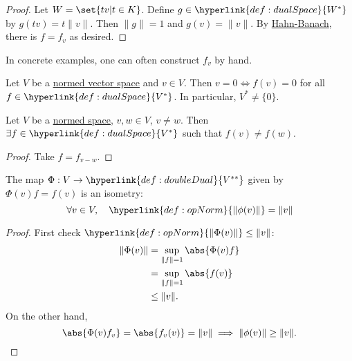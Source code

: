\documentclass{article}
\begin{document}
\begin{proof}
    Let $W = \set{t v | t \in K}$.
    Define $g \in \hyperlink{def:dualSpace}{W^*}$ by $g(tv) = t \|v\|$. Then $\|g\| = 1$ and $g(v) = \|v\|$.
    By \hyperlink{thm:hahnBanach}{Hahn-Banach}, there is $f = f_v$ as desired.
\end{proof}

\begin{remark}
    In concrete examples, one can often construct $f_v$ by hand.
\end{remark}

\begin{cor}
    Let $V$ be a \hyperlink{def:nvs}{normed vector space} and $v \in V$.
    Then $v = 0 \Longleftrightarrow f(v) = 0$ for all $f \in \hyperlink{def:dualSpace}{V^*}$.
    In particular, $V^* \neq \{0\}$.
\end{cor}

\begin{cor}
    Let $V$ be a \hyperlink{def:nvs}{normed space}, $v, w \in V$, $v \neq w$. Then $\exists f \in \hyperlink{def:dualSpace}{V^*}$ such that $f(v) \neq f(w)$.
\end{cor}

\begin{proof}
    Take $f = f_{v - w}$.
\end{proof}

\begin{cor}
    The map $\Phi: V \to \hyperlink{def:doubleDual}{V^{**}}$ given by $\Phi(v) f = f(v)$ is an isometry:
    \begin{equation*}
        \forall v \in V, \quad \hyperlink{def:opNorm}{\|\phi(v)\|} = \|v\|
    \end{equation*}
\end{cor}

\begin{proof}
    First check $\hyperlink{def:opNorm}{\|\Phi(v)\|} \leq \|v\|$:
    \begin{align*}
        \|\Phi(v)\| &= \sup_{\|f\| = 1} \abs{\Phi(v) f} \\
                       &= \sup_{\|f\| = 1} \abs{f(v)} \\
                       &\leq \|v\|.
    \end{align*}
    On the other hand,
    \begin{equation*}
        \abs{\Phi(v) f_v} = \abs{f_v(v)} = \|v\| \implies \|\phi(v)\| \geq \|v\|.\qedhere
    \end{equation*}
\end{proof}
\end{document}
